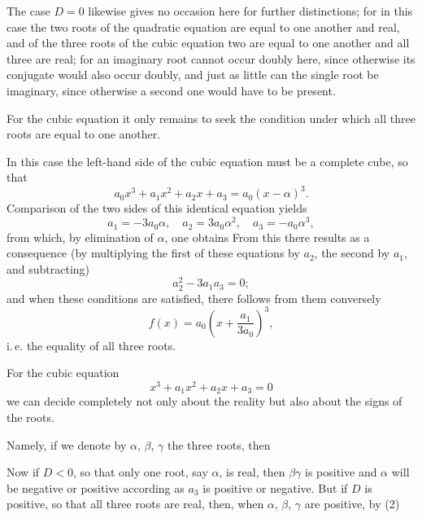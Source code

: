 
The case $D=0$ likewise gives no occasion here for further distinctions; for in this case the two roots of the quadratic equation are equal to one another and real, and of the three roots of the cubic equation two are equal to one another and all three are real; for an imaginary root cannot occur doubly here, since otherwise its conjugate would also occur doubly, and just as little can the single root be imaginary, since otherwise a second one would have to be present.

For the cubic equation it only remains to seek the condition under which all three roots are equal to one another.

In this case the left-hand side of the cubic equation must be a complete cube, so that
\[
a_0 x^3 + a_1 x^2 + a_2 x + a_3 = a_0 (x - \alpha)^3.
\]
Comparison of the two sides of this identical equation yields
\[
a_1 = -3a_0\alpha, \quad a_2 = 3a_0\alpha^2, \quad a_3 = -a_0\alpha^3,
\]
from which, by elimination of $\alpha$, one obtains
From this there results as a consequence (by multiplying the first of these equations by $a_2$, the second by $a_1$, and subtracting)
\[
a_2^2 - 3a_1a_3 = 0;
\]
and when these conditions are satisfied, there follows from them conversely
\[
f(x) = a_0\left(x + \frac{a_1}{3a_0}\right)^3,
\]
i.\,e. the equality of all three roots.

For the cubic equation
\[
x^3 + a_1 x^2 + a_2 x + a_3 = 0
\]
we can decide completely not only about the reality but also about the signs of the roots.

Namely, if we denote by $\alpha$, $\beta$, $\gamma$ the three roots, then

Now if $D<0$, so that only one root, say $\alpha$, is real, then $\beta\gamma$ is positive and $\alpha$ will be negative or positive according as $a_3$ is positive or negative. But if $D$ is positive, so that all three roots are real, then, when $\alpha$, $\beta$, $\gamma$ are positive, by (2)

